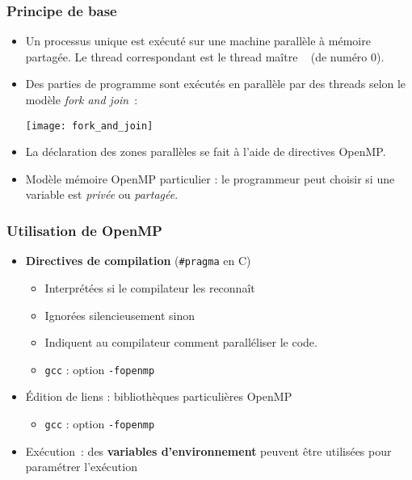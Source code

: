 \documentclass{beamer}
\begin{document}
\begin{frame}
  \frametitle{Principe de base}
\begin{itemize}
  
\item Un processus unique est exécuté sur une machine parallèle à mémoire
  partagée. Le thread correspondant est le thread \og maître \fg~ (de numéro 0).
  
\item Des parties de programme sont exécutés en parallèle par des threads selon
  le modèle {\it fork and join}~:

  \smallskip
  \begin{center}
    \texttt{[image: fork\_and\_join]}
  \end{center}
  \bigskip
  
\item La déclaration des zones parallèles se fait à l'aide de
  directives OpenMP.

\item Modèle mémoire OpenMP particulier : le programmeur peut choisir si une
  variable est {\it privée} ou {\it partagée}.
\end{itemize}

\end{frame}





\begin{frame}
  \frametitle{Utilisation de OpenMP}
  
\begin{itemize}
\item \textbf{Directives de compilation} ({\tt \#pragma} en C)
  \begin{itemize}
  \item Interprétées si le compilateur les reconnaît
  \item Ignorées \alert{silencieusement} sinon
  \item Indiquent au compilateur comment paralléliser le code.
  \item \texttt{gcc} : option \texttt{-fopenmp}
  \end{itemize}

\medskip
  
\item Édition de liens : bibliothèques particulières OpenMP
  \begin{itemize}
  \item \texttt{gcc} : option \texttt{-fopenmp}
  \end{itemize}

\medskip
  
\item Exécution~: des \textbf{variables d'environnement} peuvent être utilisées pour paramétrer
  l'exécution
\end{itemize}
\end{frame}
\end{document}
